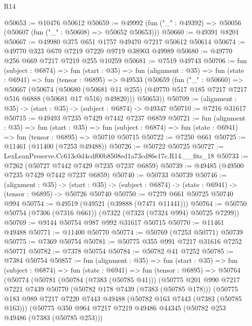 \begin{lexlean}{R14}
\begin{coremodule}
@50653 := @10476 @50612
@50659 := @49992 (fun ("_" : @49392) => @50056 (@50607 (fun ("_" : @50608) => @50652 @50653)))
@50660 := @49391 @8201
@50667 := @49980 @375 @651 @1757 @49470 @7217 @50612 @50614
@50674 := @49770 @323 @670 @7219 @7220 @9719 @38903 @49989
@50680 := @49770 @256 @669 @7217 @7219 @255 @10259
@50681 := @7519 @49743
@50706 := fun (subject : @6874) =>
  fun (start : @35) =>
  fun (alignment : @35) =>
  fun (state : @6941) =>
  fun (tensor : @6895) =>
  @49533
    (@50659
      (fun ("_" : @50660) =>
      @50667
        (@50674
          (@50680
            (@50681 @11 @255)
            (@49770 @517 @185 @7217 @7217 @516 @6888 (@50681 @17 @516) @49820)))
        @50653))
@50709 := (alignment : @35) -> (start : @35) -> (subject : @6874) -> @49347
@50710 := @7216 @31617
@50715 := @49493 @7235 @7429 @7442 @7237 @6859
@50721 := fun (alignment : @35) =>
  fun (start : @35) =>
  fun (subject : @6874) => fun (state : @6941) => fun (tensor : @6895) => @50710 @50715
@50722 := @7250 @661
@50725 := @11461 (@11400 (@7253 @49488))
@50726 := @50722 @50725
@50727 := LexLeanPreserve.Cc613c0d4cdf00b8508ed1a73cd86e17c.R14.__fits_18
@50733 := @7262 (@50727 @7442 @7429 @7235 @7237 @6859)
@50739 := @49485 (@49500 @7235 @7429 @7442 @7237 @6859)
@50740 := @50733 @50739
@50746 := (alignment : @35) ->
  (start : @35) -> (subject : @6874) -> (state : @6941) -> (tensor : @6895) -> @50726 @50740
@50750 := @7279 @661 @50725 @50740 @994
@50754 := @49519 (@49521 (@39888 (@7471 @11441)))
@50764 := @50750 @50754 (@7306 (@7316 @661)) (@7322 (@7323 (@7324 @994) @50725 @7299))
@50769 := @9144 @50754 @987 @992 @31617 @50715
@50770 := @11461 @49488
@50771 := @11400 @50770
@50774 := @50769 (@7253 @50771) @50739
@50775 := @7369 @50754
@50781 := @50775 @355 @991 @7217 @31616 @7252 @50771
@50782 := @7378 @50754
@50784 := @50782 @41 @7252
@50785 := @7384 @50754
@50857 := fun (alignment : @35) =>
  fun (start : @35) =>
  fun (subject : @6874) =>
  fun (state : @6941) =>
  fun (tensor : @6895) =>
  @50764
    (@50774
      (@50781
        (@50784 (@7383 (@50785 @41)))
        (@50775
          @201
          @990
          @7217
          @7221
          @7439
          @50770
          (@50782 @178 @7439 (@7383 (@50785 @178)))
          (@50775
            @183
            @989
            @7217
            @7220
            @7443
            @49488
            (@50782 @163 @7443 (@7383 (@50785 @163)))
            (@50775
              @350
              @964
              @7217
              @7219
              @49486
              @44345
              (@50782 @253 @49486 (@7383 (@50785 @253)))

\end{coremodule}
\end{lexlean}
